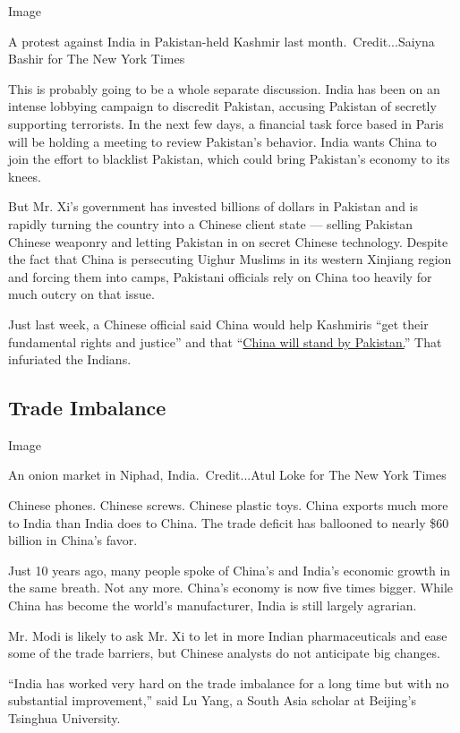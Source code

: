 Image

A protest against India in Pakistan-held Kashmir last
month.~Credit...Saiyna Bashir for The New York Times

This is probably going to be a whole separate discussion. India has been
on an intense lobbying campaign to discredit Pakistan, accusing Pakistan
of secretly supporting terrorists. In the next few days, a financial
task force based in Paris will be holding a meeting to review Pakistan's
behavior. India wants China to join the effort to blacklist Pakistan,
which could bring Pakistan's economy to its knees.

But Mr. Xi's government has invested billions of dollars in Pakistan and
is rapidly turning the country into a Chinese client state --- selling
Pakistan Chinese weaponry and letting Pakistan in on secret Chinese
technology. Despite the fact that China is persecuting Uighur Muslims in
its western Xinjiang region and forcing them into camps, Pakistani
officials rely on China too heavily for much outcry on that issue.

Just last week, a Chinese official said China would help Kashmiris ``get
their fundamental rights and justice'' and that
``\href{https://indianexpress.com/article/india/china-on-kashmir-lockdown-india-pakistan-6055722/}{China
will stand by Pakistan.}'' That infuriated the Indians.

\hypertarget{trade-imbalance}{%
\subsection{Trade Imbalance}\label{trade-imbalance}}

Image

An onion market in Niphad, India.~Credit...Atul Loke for The New York
Times

Chinese phones. Chinese screws. Chinese plastic toys. China exports much
more to India than India does to China. The trade deficit has ballooned
to nearly \$60 billion in China's favor.

Just 10 years ago, many people spoke of China's and India's economic
growth in the same breath. Not any more. China's economy is now five
times bigger. While China has become the world's manufacturer, India is
still largely agrarian.

Mr. Modi is likely to ask Mr. Xi to let in more Indian pharmaceuticals
and ease some of the trade barriers, but Chinese analysts do not
anticipate big changes.

``India has worked very hard on the trade imbalance for a long time but
with no substantial improvement,'' said Lu Yang, a South Asia scholar at
Beijing's Tsinghua University.

